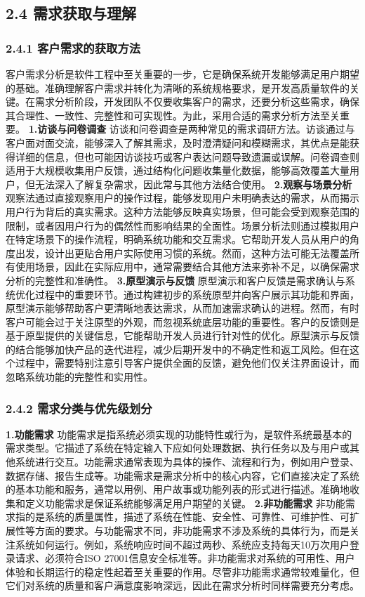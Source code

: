\subsection{2.4 需求获取与理解}\label{ux9700ux6c42ux83b7ux53d6ux4e0eux7406ux89e3} \subsubsection{2.4.1 客户需求的获取方法}\label{ux5ba2ux6237ux9700ux6c42ux7684ux83b7ux53d6ux65b9ux6cd5} 客户需求分析是软件工程中至关重要的一步，它是确保系统开发能够满足用户期望的基础。准确理解客户需求并转化为清晰的系统规格要求，是开发高质量软件的关键。在需求分析阶段，开发团队不仅要收集客户的需求，还要分析这些需求，确保其合理性、一致性、完整性和可实现性。为此，采用合适的需求分析方法至关重要。 \textbf{1.访谈与问卷调查} 访谈和问卷调查是两种常见的需求调研方法。访谈通过与客户面对面交流，能够深入了解其需求，及时澄清疑问和模糊需求，其优点是能获得详细的信息，但也可能因访谈技巧或客户表达问题导致遗漏或误解。问卷调查则适用于大规模收集用户反馈，通过结构化问题收集量化数据，能够高效覆盖大量用户，但无法深入了解复杂需求，因此常与其他方法结合使用。 \textbf{2.观察与场景分析} 观察法通过直接观察用户的操作过程，能够发现用户未明确表达的需求，从而揭示用户行为背后的真实需求。这种方法能够反映真实场景，但可能会受到观察范围的限制，或者因用户行为的偶然性而影响结果的全面性。场景分析法则通过模拟用户在特定场景下的操作流程，明确系统功能和交互需求。它帮助开发人员从用户的角度出发，设计出更贴合用户实际使用习惯的系统。然而，这种方法可能无法覆盖所有使用场景，因此在实际应用中，通常需要结合其他方法来弥补不足，以确保需求分析的完整性和准确性。 \textbf{3.原型演示与反馈} 原型演示和客户反馈是需求确认与系统优化过程中的重要环节。通过构建初步的系统原型并向客户展示其功能和界面，原型演示能够帮助客户更清晰地表达需求，从而加速需求确认的进程。然而，有时客户可能会过于关注原型的外观，而忽视系统底层功能的重要性。客户的反馈则是基于原型提供的关键信息，它能帮助开发人员进行针对性的优化。原型演示与反馈的结合能够加快产品的迭代进程，减少后期开发中的不确定性和返工风险。但在这个过程中，需要特别注意引导客户提供全面的反馈，避免他们仅关注界面设计，而忽略系统功能的完整性和实用性。 \subsubsection{2.4.2 需求分类与优先级划分}\label{ux9700ux6c42ux5206ux7c7bux4e0eux4f18ux5148ux7ea7ux5212ux5206} \textbf{1.功能需求} 功能需求是指系统必须实现的功能特性或行为，是软件系统最基本的需求类型。它描述了系统在特定输入下应如何处理数据、执行任务以及与用户或其他系统进行交互。功能需求通常表现为具体的操作、流程和行为，例如用户登录、数据存储、报告生成等。功能需求是需求分析中的核心内容，它们直接决定了系统的基本功能和服务，通常以用例、用户故事或功能列表的形式进行描述。准确地收集和定义功能需求是保证系统能够满足用户期望的关键。 \textbf{2.非功能需求} 非功能需求指的是系统的质量属性，描述了系统在性能、安全性、可靠性、可维护性、可扩展性等方面的要求。与功能需求不同，非功能需求不涉及系统的具体行为，而是关注系统如何运行。例如，系统响应时间不超过两秒、系统应支持每天10万次用户登录请求、必须符合ISO 27001信息安全标准等。非功能需求对系统的可用性、用户体验和长期运行的稳定性起着至关重要的作用。尽管非功能需求通常较难量化，但它们对系统的质量和客户满意度影响深远，因此在需求分析时同样需要充分考虑。 